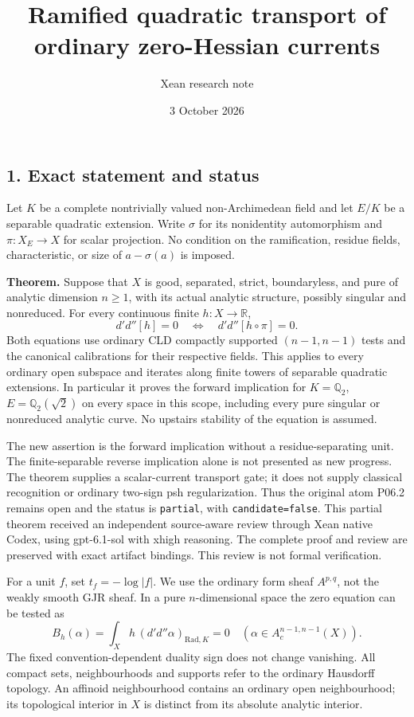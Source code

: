 \documentclass[
  11pt,
]{article}
\title{Ramified quadratic transport of ordinary zero-Hessian currents}
\author{Xean research note}
\date{3 October 2026}
\begin{document}
\maketitle

\subsection{1. Exact statement and
status}\label{exact-statement-and-status}

Let \(K\) be a complete nontrivially valued non-Archimedean field and
let \(E/K\) be a separable quadratic extension. Write \(\sigma\) for its
nonidentity automorphism and \(\pi:X_E\to X\) for scalar projection. No
condition on the ramification, residue fields, characteristic, or size
of \(a-\sigma(a)\) is imposed.

\textbf{Theorem.} Suppose that \(X\) is good, separated, strict,
boundaryless, and pure of analytic dimension \(n\geq1\), with its actual
analytic structure, possibly singular and nonreduced. For every
continuous finite \(h:X\to\mathbb R\), \[
 d'd''[h]=0\quad\Longleftrightarrow\quad
 d'd''[h\circ\pi]=0.                                      \tag{1}
\] Both equations use ordinary CLD compactly supported \((n-1,n-1)\)
tests and the canonical calibrations for their respective fields. This
applies to every ordinary open subspace and iterates along finite towers
of separable quadratic extensions. In particular it proves the forward
implication for \(K=\mathbb Q_2\), \(E=\mathbb Q_2(\sqrt2)\) on every
space in this scope, including every pure singular or nonreduced
analytic curve. No upstairs stability of the equation is assumed.

The new assertion is the forward implication without a
residue-separating unit. The finite-separable reverse implication alone
is not presented as new progress. The theorem supplies a scalar-current
transport gate; it does not supply classical recognition or ordinary
two-sign psh regularization. Thus the original atom P06.2 remains open
and the status is \texttt{partial}, with \texttt{candidate=false}. This
partial theorem received an independent source-aware review through
Xean native Codex, using gpt-6.1-sol with xhigh reasoning. The complete
proof and review are preserved with exact artifact bindings. This
review is not formal verification.

For a unit \(f\), set \(t_f=-\log|f|\). We use the ordinary form sheaf
\(A^{p,q}\), not the weakly smooth GJR sheaf. In a pure
\(n\)-dimensional space the zero equation can be tested as \[
 B_h(\alpha)=\int_X h\,(d'd''\alpha)_{\mathrm{Rad},K}=0
 \quad(\alpha\in A_c^{n-1,n-1}(X)).                         \tag{2}
\] The fixed convention-dependent duality sign does not change
vanishing. All compact sets, neighbourhoods and supports refer to the
ordinary Hausdorff topology. An affinoid neighbourhood contains an
ordinary open neighbourhood; its topological interior in \(X\) is
distinct from its absolute analytic interior.
\end{document}
